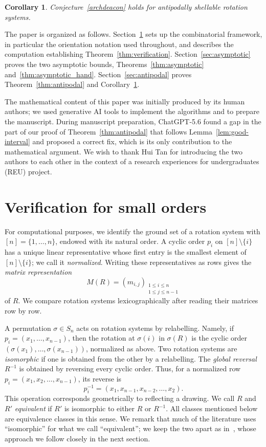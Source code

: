 \documentclass{article}
\theoremstyle{plain}
\newtheorem{corollary}[theorem]{Corollary}
\theoremstyle{definition}
\theoremstyle{remark}
\begin{document}
\begin{corollary}\label{cor:antipodal}
Conjecture~\ref{archdeacon} holds for antipodally shellable rotation
systems.
\end{corollary}

The paper is organized as follows.  Section~\ref{sec:verification}
sets up the combinatorial framework, in particular the orientation
notation used throughout, and describes the computation establishing
Theorem~\ref{thm:verification}.  Section~\ref{sec:asymptotic} proves
the two asymptotic bounds, Theorems~\ref{thm:asymptotic}
and~\ref{thm:asymptotic_hand}.  Section~\ref{sec:antipodal} proves
Theorem~\ref{thm:antipodal} and Corollary~\ref{cor:antipodal}.

\bigskip {}
The mathematical content of this paper was initially produced by its human authors; we
used generative AI tools to implement the algorithms and to
prepare the manuscript. During manuscript preparation, ChatGPT-5.6 found a gap in the part of our proof of Theorem~\ref{thm:antipodal} that follows Lemma~\ref{lem:good-interval} and proposed a correct fix, which is its only contribution to the mathematical argument. We wish to thank Hui Tan for introducing the two
authors to each other in the context of a research experiences for
undergraduates (REU) project.

\section{Verification for small orders}\label{sec:verification}

For computational purposes, we identify the ground set of a rotation system with
\([n]=\{1,\ldots,n\}\), endowed with its natural order.  A cyclic order
\(p_i\) on \([n]\setminus\{i\}\) has a unique linear representative
whose first entry is the smallest element of \([n]\setminus\{i\}\); we
call it \emph{normalized}.
Writing these representatives as rows gives the \emph{matrix
representation}
\[
M(R)=(m_{i,j})_{\substack{1\leq i\leq n\\1\leq j\leq n-1}}
\]
of \(R\).  We compare rotation systems lexicographically after reading
their matrices row by row.

A permutation \(\sigma\in S_n\) acts on rotation systems by
relabelling.  Namely, if \(p_i=(x_1,\ldots,x_{n-1})\), then the rotation at \(\sigma(i)\) in \(\sigma(R)\) is the cyclic
order \((\sigma(x_1),\ldots,\sigma(x_{n-1}))\), normalized as above.  Two rotation systems are \emph{isomorphic} if
one is obtained from the other by a relabelling. The \emph{global reversal} \(R^{-1}\) is obtained by reversing every
cyclic order.  Thus, for a normalized row
\(p_i=(x_1,x_2,\ldots,x_{n-1})\), its reverse is
\[
p_i^{-1}=(x_1,x_{n-1},x_{n-2},\ldots,x_2).
\]
This operation corresponds geometrically to reflecting a drawing.  We
call \(R\) and \(R'\) \emph{equivalent} if \(R'\) is isomorphic to
either \(R\) or \(R^{-1}\). All classes mentioned below are equivalence
classes in this sense. We remark that much of the literature uses ``isomorphic'' for what we
call ``equivalent''; we keep the two apart as
in~\cite{BaloghLidickySalazar2019}, whose approach we follow closely
in the next section.
\end{document}
